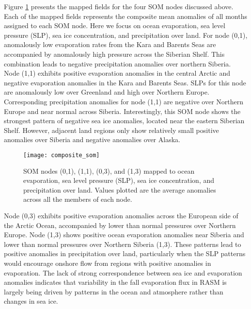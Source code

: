 Figure \ref{fig:composite_som} presents the mapped fields for the four SOM nodes discussed above.
Each of the mapped fields represents the composite mean anomalies of all months assigned to each SOM node.
Here we focus on ocean evaporation, sea level pressure (SLP), sea ice concentration, and precipitation over land.
For node (0,1), anomalously low evaporation rates from the Kara and Barents Seas are accompanied by anomalously high pressure across the Siberian Shelf.
This combination leads to negative precipitation anomalies over northern Siberia.
Node (1,1) exhibits positive evaporation anomalies in the central Arctic and negative evaporation anomalies in the Kara and Barents Seas.
SLPs for this node are anomalously low over Greenland and high over Northern Europe.
Corresponding precipitation anomalies for node (1,1) are negative over Northern Europe and near normal across Siberia.
Interestingly, this SOM node shows the strongest pattern of negative sea ice anomalies, located near the eastern Siberian Shelf.
However, adjacent land regions only show relatively small positive anomalies over Siberia and negative anomalies over Alaska.

\begin{figure}
  \centering
  \texttt{[image: composite\_som]}
  \caption{SOM nodes (0,1), (1,1), (0,3), and (1,3) mapped to ocean evaporation, sea level pressure (SLP), sea ice concentration, and precipitation over land. Values plotted are the average anomalies across all the members of each node.} %
  \label{fig:composite_som}
\end{figure}

Node (0,3) exhibits positive evaporation anomalies across the European side of the Arctic Ocean, accompanied by lower than normal pressures over Northern Europe. %
Node (1,3) shows positive ocean evaporation anomalies near Siberia and lower than normal pressures over Northern Siberia (1,3).
These patterns lead to positive anomalies in precipitation over land, particularly when the SLP patterns would encourage onshore flow from regions with positive anomalies in evaporation.
The lack of strong correspondence between sea ice and evaporation anomalies indicates that variability in the fall evaporation flux in RASM is largely being driven by patterns in the ocean and atmosphere rather than changes in sea ice.

